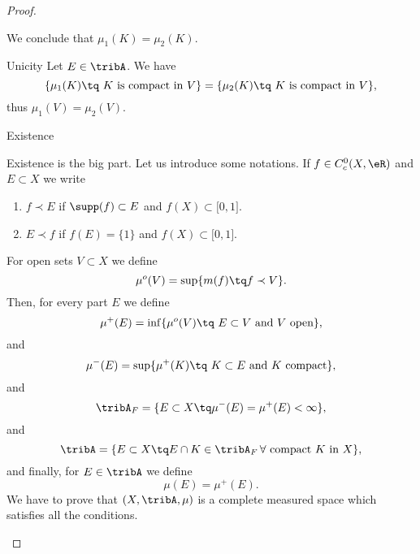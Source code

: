 \begin{proof}
\begin{subproof}
    We conclude that \( \mu_1(K)=\mu_2(K)\).
\item[Unicity]
    Let \( E\in\tribA\). We have
    \begin{equation}
        \{ \mu_1(K)\tq \text{ \( K\) is compact in \( V\)} \} = \{ \mu_2(K)\tq \text{ \( K\) is compact in \( V\)} \},
    \end{equation}
    thus \( \mu_1(V)=\mu_2(V)\).
    \end{subproof}
    \begin{center}
        Existence
    \end{center}
    Existence is the big part. Let us introduce some notations. If \( f\in C^0_c(X,\eR)\) and \( E\subset X\) we write
    \begin{enumerate}
        \item \( f\prec E\) if \( \supp(f)\subset E\) and \( f(X)\subset \mathopen[ 0 , 1 \mathclose]\).
        \item \( E\prec f\) if \( f(E)=\{ 1 \}\) and \( f(X)\subset \mathopen[ 0 , 1 \mathclose]\).
    \end{enumerate}
    For open sets \( V\subset X\) we define
    \begin{equation}
        \mu^o(V)=\sup\{ m(f)\tq f\prec V \}.
    \end{equation}
    Then, for every part \( E\) we define
    \begin{equation}
        \mu^+(E)=\inf\{ \mu^o(V)\tq \text{ \( E\subset V\) and \( V\) open} \},
    \end{equation}
    and
    \begin{equation}        \label{EQooSIKUooJeeIqI}
        \mu^-(E)=\sup\{ \mu^+(K)\tq \text{ \( K\subset E\) and \( K\) compact} \},
    \end{equation}
    and
    \begin{equation}
        \tribA_F=\{ E\subset X\tq \mu^-(E)=\mu^+(E)<\infty \},
    \end{equation}
    and
    \begin{equation}
        \tribA=\{ E\subset X\tq E\cap K\in \tribA_F\,\text{\( \forall\) compact \( K\) in \( X\)} \},
    \end{equation}
    and finally, for \( E\in \tribA\) we define
    \begin{equation}
        \mu(E)=\mu^+(E).
    \end{equation}
    We have to prove that \( (X,\tribA,\mu)\) is a complete measured space which satisfies all the conditions.
    \begin{subproof}

\end{subproof}
\end{proof}
